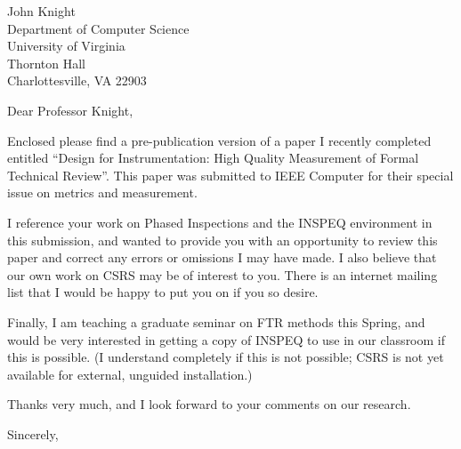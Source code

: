 



\signature {Philip Johnson}

\address{548 Kaimake Loop\\
         Kailua, HI 96734}
\indentclosing

\begin {letter}
  {John Knight\\
   Department of Computer Science\\
   University of Virginia\\
   Thornton Hall\\
   Charlottesville, VA 22903}

\opening {Dear Professor Knight,}

Enclosed please find a pre-publication version of a paper I recently
completed entitled ``Design for Instrumentation: High Quality Measurement
of Formal Technical Review''.  This paper was submitted to IEEE Computer
for their special issue on metrics and measurement.

I reference your work on Phased Inspections and the INSPEQ environment in
this submission, and wanted to provide you with an opportunity to review
this paper and correct any errors or omissions I may have made.  I also
believe that our own work on CSRS may be of interest to you.  There is an
internet mailing list that I would be happy to put you on if you so desire.

Finally, I am teaching a graduate seminar on FTR methods this Spring, and
would be very interested in getting a copy of INSPEQ to use in our
classroom if this is possible.  (I understand completely if this is not
possible; CSRS is not yet available for external, unguided installation.)

Thanks very much, and I look forward to your comments on our research.

\closing{Sincerely,}

\end{letter}

